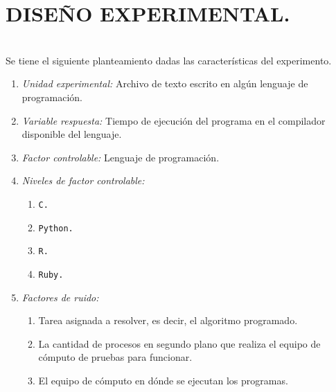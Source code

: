 \documentclass[11pt,a4paper]{article}
\begin{document}
\section{DISEÑO EXPERIMENTAL.} %
\label{sec:adaptacion_exp}
\noindent{}\\[3mm]
Se tiene el siguiente planteamiento dadas las características del experimento.
\begin{enumerate}
	\item \textit{Unidad experimental:} Archivo de texto escrito en algún lenguaje de programación.
	\item \textit{Variable respuesta:} Tiempo de ejecución del programa en el compilador disponible del lenguaje.
	\item \textit{Factor controlable:} Lenguaje de programación.
	\item \textit{Niveles de factor controlable:} \vspace{-3mm}
		\begin{multicols}{4}
			\begin{enumerate}
			\item \texttt{C.}
			\item \texttt{Python.}
			\item \texttt{R.}
			\item \texttt{Ruby.}
		\end{enumerate}
		\end{multicols} \vspace{-6mm}
	\item \textit{Factores de ruido:} \vspace{-2mm}
		\begin{enumerate}
			\item Tarea asignada a resolver, es decir, el algoritmo programado.
			\item La cantidad de procesos en segundo plano que realiza el equipo de cómputo de pruebas para funcionar.
			\item El equipo de cómputo en dónde se ejecutan los programas. \vspace{-3mm}
				\begin{multicols}{3}

\end{multicols}
\end{enumerate}
\end{enumerate}
\end{document}
